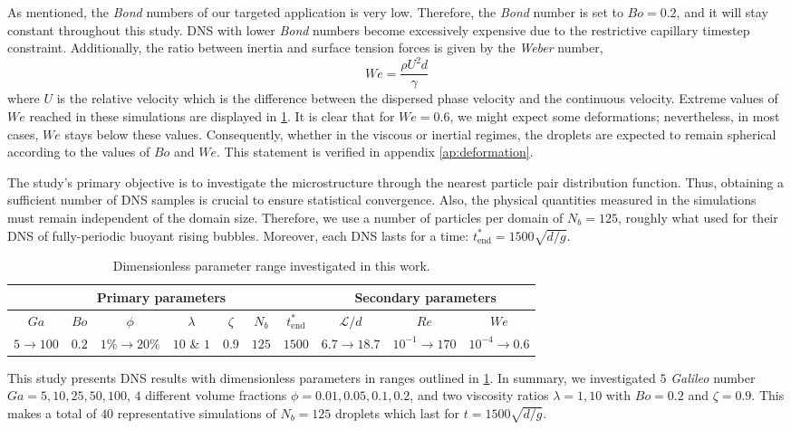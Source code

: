 \documentclass[11pt]{My_preprint}
\providecommand{\DIFaddbegin}{} %
\begin{document}
As mentioned, the \textit{Bond} numbers of our targeted application is very low.
Therefore, the \textit{Bond} number is set to $Bo = 0.2$, and it will stay constant throughout this study.
DNS with lower \textit{Bond} numbers become excessively expensive due to the restrictive capillary timestep constraint. 
Additionally, the ratio between inertia and surface tension forces is given by the \textit{Weber} number, 
\begin{equation*}
    We = \frac{\rho U^2d}{\gamma}\end{equation*}
where $U$ is the relative velocity which is the difference between the dispersed phase velocity and the continuous velocity. Extreme values of $We$ reached in these simulations are displayed in \ref{tab:simulations}. 
It is clear that for $We=0.6$, we might expect some deformations; nevertheless, in most cases, $We$ stays below these values. 
Consequently, whether in the viscous or inertial regimes, the droplets are expected to remain spherical according to the values of $Bo$ and $We$.
This statement is verified in appendix \ref{ap:deformation}.


The study's primary objective is to investigate the microstructure through the nearest particle pair distribution function.
Thus, obtaining a sufficient number of DNS samples is crucial to ensure statistical convergence. 
Also, the physical quantities measured in the simulations must remain independent of the domain size. 
Therefore, we use a number of particles per domain of $N_b = 125$, roughly what \citet{hidman2023assessing} used for their DNS of fully-periodic buoyant rising bubbles.
Moreover, each DNS lasts for a time: $t^*_\text{end} = 1500 \sqrt{d/g}$.
\begin{table}[h!]
    \centering
    \caption{Dimensionless parameter range investigated in this work.}
    \begin{tabular}{|ccccccc|ccc|}\hline
        \multicolumn{7}{|c|}{Primary parameters}&\multicolumn{3}{|c|}{Secondary parameters}\\\hline\hline
        $Ga$&$Bo$&$\phi$&$\lambda$&$\zeta$&$N_b$&$t^*_\text{end}$&$\mathcal{L}/d$&$Re$&$We$\\ \hline
        $5\rightarrow 100$&$0.2$&$1\% \rightarrow 20\%$&$10$ \& $1$&$0.9$&$125$&$1500$&$6.7\to 18.7$&$10^{-1}\to 170$&$10^{-4}\to 0.6$\\ \hline
    \end{tabular}
    \label{tab:simulations}
\end{table}
This study presents DNS results with dimensionless parameters in ranges outlined in \ref{tab:simulations}.
In summary, we investigated $5$ \textit{Galileo} number $Ga = 5,10,25,50,100$, $4$ different volume fractions $\phi = 0.01,0.05,0.1,0.2$, and two viscosity ratios $\lambda =1,10$ with $Bo = 0.2$ and $\zeta = 0.9$. This makes a total of $40$ representative simulations of $N_b = 125$ droplets which last for $t= 1500 \sqrt{d/g}$. 
\DIFaddbegin 
\end{document}
